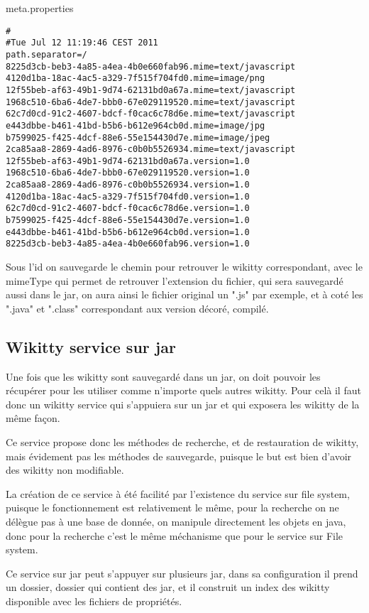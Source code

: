 meta.properties
\begin{verbatim}
#
#Tue Jul 12 11:19:46 CEST 2011
path.separator=/
8225d3cb-beb3-4a85-a4ea-4b0e660fab96.mime=text/javascript
4120d1ba-18ac-4ac5-a329-7f515f704fd0.mime=image/png
12f55beb-af63-49b1-9d74-62131bd0a67a.mime=text/javascript
1968c510-6ba6-4de7-bbb0-67e029119520.mime=text/javascript
62c7d0cd-91c2-4607-bdcf-f0cac6c78d6e.mime=text/javascript
e443dbbe-b461-41bd-b5b6-b612e964cb0d.mime=image/jpg
b7599025-f425-4dcf-88e6-55e154430d7e.mime=image/jpeg
2ca85aa8-2869-4ad6-8976-c0b0b5526934.mime=text/javascript
12f55beb-af63-49b1-9d74-62131bd0a67a.version=1.0
1968c510-6ba6-4de7-bbb0-67e029119520.version=1.0
2ca85aa8-2869-4ad6-8976-c0b0b5526934.version=1.0
4120d1ba-18ac-4ac5-a329-7f515f704fd0.version=1.0
62c7d0cd-91c2-4607-bdcf-f0cac6c78d6e.version=1.0
b7599025-f425-4dcf-88e6-55e154430d7e.version=1.0
e443dbbe-b461-41bd-b5b6-b612e964cb0d.version=1.0
8225d3cb-beb3-4a85-a4ea-4b0e660fab96.version=1.0
\end{verbatim}


Sous l'id on sauvegarde le chemin pour retrouver le wikitty correspondant, 
avec le mimeType qui permet de retrouver l'extension du fichier, qui sera sauvegardé
aussi dans le jar, on aura ainsi le fichier original un ".js" par exemple, 
et à coté les ".java" et ".class" correspondant aux version décoré, compilé.


\subsection{Wikitty service sur jar}

Une fois que les wikitty sont sauvegardé dans un jar, on doit pouvoir les 
récupérer pour les utiliser comme n'importe quels autres wikitty. Pour celà il 
faut donc un wikitty service qui s'appuiera sur un jar et qui exposera les 
wikitty de la même façon.

Ce service propose donc les méthodes de recherche, et de restauration de wikitty,
mais évidement pas les méthodes de sauvegarde, puisque le but est bien d'avoir
des wikitty non modifiable.

La création de ce service à été facilité par l'existence du service sur file
system, puisque le fonctionnement est relativement le même, pour la recherche
on ne délègue pas à une base de donnée, on manipule directement les objets en
java, donc pour la recherche c'est le même méchanisme que pour le service sur
File system.

Ce service sur jar peut s'appuyer sur plusieurs jar, dans sa configuration 
il prend un dossier, dossier qui contient des jar, et il construit un index 
des wikitty disponible avec les fichiers de propriétés. 


